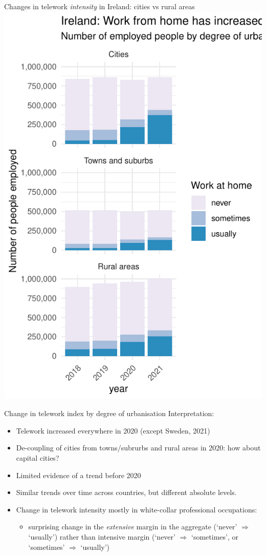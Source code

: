 \documentclass[10pt]{beamer}
\begin{document}
\begin{frame}{Changes in telework \emph{intensity} in Ireland: cities vs rural areas}
\pause
\centering
\includegraphics[width=\textwidth,height=0.9\textheight,keepaspectratio]{Telework_intensity_degurba_ireland.pdf}
\end{frame}


\begin{frame}{Change in telework index by degree of urbanisation}
Interpretation:
\begin{itemize}
\item Telework increased everywhere in 2020 (except Sweden, 2021)
\item De-coupling of cities from towns/subrurbs and rural areas in 2020: how about capital cities?
\item Limited evidence of a trend before 2020
\item Similar trends over time across countries, but different absolute levels.
\item Change in telework intensity mostly in white-collar professional occupations:
\begin{itemize}
  \item surprising change in the \emph{extensive} margin in the aggregate (`never' $\Rightarrow$ `usually') rather than intensive margin (`never' $\Rightarrow$ `sometimes', or `sometimes' $\Rightarrow$ `usually')
\end{itemize}
\end{itemize}
\end{frame}
\end{document}
